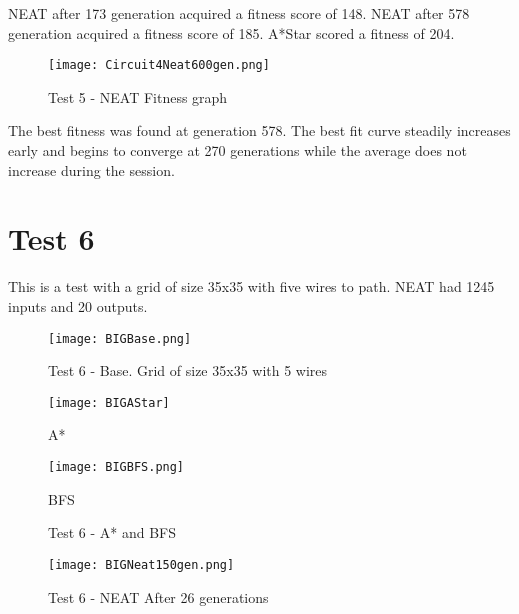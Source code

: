 \documentclass{kththesis}
\begin{document}
NEAT after 173 generation acquired a fitness score of 148. NEAT after 578 generation acquired a fitness score of 185. A*Star scored a fitness of 204.

\clearpage
 
\begin{figure}[h]
{\centering
\begin{minipage}{1\textwidth}
\centering
\texttt{[image: Circuit4Neat600gen.png]}
\end{minipage}\hfill
\caption{Test 5 - NEAT Fitness graph}
}

\end{figure}

The best fitness was found at generation 578. The best fit curve steadily increases early and begins to converge at 270 generations while the average does not increase during the session. 
 
\clearpage
 
\section{Test 6}
 
This is a test with a grid of size 35x35 with five wires to path. NEAT had 1245 inputs and 20 outputs.
 
\begin{figure}[h]
\centering
 
\begin{minipage}{1\textwidth}
\centering
\texttt{[image: BIGBase.png]}
\end{minipage}\hfill
\caption{Test 6 - Base. Grid of size 35x35 with 5 wires}
\label{Test 6 Base}
\end{figure}
 
\begin{figure}[h]
\centering
 
\begin{minipage}{0.45\textwidth}
\centering
\texttt{[image: BIGAStar]}
\caption{A*}
\end{minipage}\hfill
\begin{minipage}{0.45\textwidth}
\centering
\texttt{[image: BIGBFS.png]}
\caption{BFS}
\end{minipage}\hfill
\caption{Test 6 - A* and BFS}
\label{Test 6 A*}
\end{figure}
 
\begin{figure}[h]
\centering
\begin{minipage}{1\textwidth}
\centering
\texttt{[image: BIGNeat150gen.png]}
\end{minipage}\hfill
\caption{Test 6 - NEAT After 26 generations}
\label{Test 6 26}
\end{figure}
 
\end{document}
